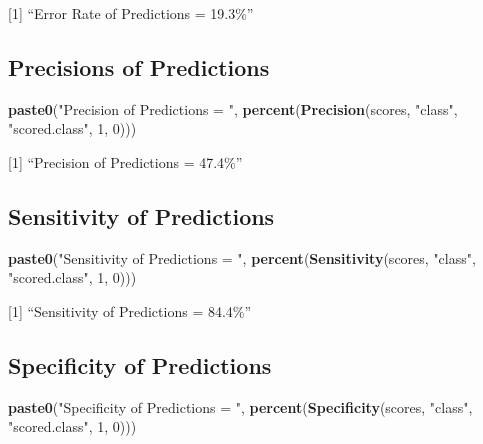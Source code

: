 \documentclass[]{article}
\newenvironment{Shaded}{\begin{snugshade}}{\end{snugshade}}
\newcommand{\KeywordTok}[1]{\textcolor[rgb]{0.13,0.29,0.53}{\textbf{{#1}}}}
\newcommand{\DecValTok}[1]{\textcolor[rgb]{0.00,0.00,0.81}{{#1}}}
\newcommand{\StringTok}[1]{\textcolor[rgb]{0.31,0.60,0.02}{{#1}}}
\newcommand{\NormalTok}[1]{{#1}}
\begin{document}
{[}1{]} ``Error Rate of Predictions = 19.3\%''

\subsection{Precisions of Predictions}\label{precisions-of-predictions}

\begin{Shaded}
\begin{Highlighting}[]
\KeywordTok{paste0}\NormalTok{(}\StringTok{"Precision of Predictions = "}\NormalTok{, }\KeywordTok{percent}\NormalTok{(}\KeywordTok{Precision}\NormalTok{(scores, }\StringTok{"class"}\NormalTok{, }\StringTok{"scored.class"}\NormalTok{, }
    \DecValTok{1}\NormalTok{, }\DecValTok{0}\NormalTok{)))}
\end{Highlighting}
\end{Shaded}

{[}1{]} ``Precision of Predictions = 47.4\%''

\subsection{Sensitivity of
Predictions}\label{sensitivity-of-predictions}

\begin{Shaded}
\begin{Highlighting}[]
\KeywordTok{paste0}\NormalTok{(}\StringTok{"Sensitivity of Predictions = "}\NormalTok{, }\KeywordTok{percent}\NormalTok{(}\KeywordTok{Sensitivity}\NormalTok{(scores, }\StringTok{"class"}\NormalTok{, }
    \StringTok{"scored.class"}\NormalTok{, }\DecValTok{1}\NormalTok{, }\DecValTok{0}\NormalTok{)))}
\end{Highlighting}
\end{Shaded}

{[}1{]} ``Sensitivity of Predictions = 84.4\%''

\subsection{Specificity of
Predictions}\label{specificity-of-predictions}

\begin{Shaded}
\begin{Highlighting}[]
\KeywordTok{paste0}\NormalTok{(}\StringTok{"Specificity of Predictions = "}\NormalTok{, }\KeywordTok{percent}\NormalTok{(}\KeywordTok{Specificity}\NormalTok{(scores, }\StringTok{"class"}\NormalTok{, }
    \StringTok{"scored.class"}\NormalTok{, }\DecValTok{1}\NormalTok{, }\DecValTok{0}\NormalTok{)))}
\end{Highlighting}
\end{Shaded}
\end{document}
